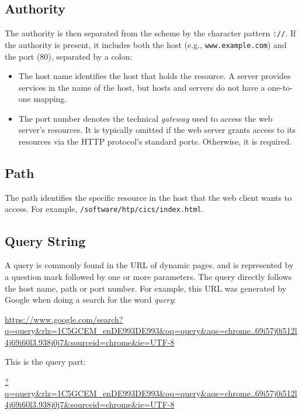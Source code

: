 \subsection*{Authority}
The authority is then separated from the scheme by the character pattern \texttt{://}. If the authority is present, it includes both the host (e.g., \texttt{www.example.com}) and the port (80), separated by a colon:

\begin{itemize}
  \item The host name identifies the host that holds the resource. A server provides services in the name of the host, but hosts and servers do not have a one-to-one mapping.
  \item The port number denotes the technical \textit{gateway} used to access the web server's resources. It is typically omitted if the web server grants access to its resources via the HTTP protocol's standard ports. Otherwise, it is required.
\end{itemize}

\subsection*{Path}
The path identifies the specific resource in the host that the web client wants to access. For example, \texttt{/software/htp/cics/index.html}.

\subsection*{Query String}
A query is commonly found in the URL of dynamic pages. and is represented by a question mark followed by one or more parameters. The query directly follows the host name, path or port number. For example, this URL was generated by Google when doing a search for the word \textit{query}:

\begin{center}
  \url{https://www.google.com/search?q=query&rlz=1C5GCEM_enDE993DE993&oq=query&aqs=chrome..69i57j0i512l4j69i60l3.938j0j7&sourceid=chrome&ie=UTF-8}
\end{center}

\noindent This is the query part:

\begin{center}
  \url{?q=query&rlz=1C5GCEM_enDE993DE993&oq=query&aqs=chrome..69i57j0i512l4j69i60l3.938j0j7&sourceid=chrome&ie=UTF-8}
\end{center}

